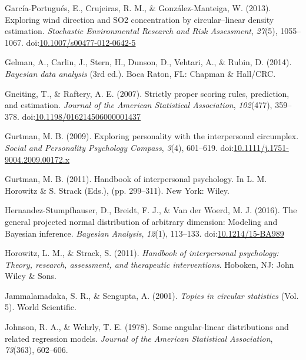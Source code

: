 \documentclass[man,mask]{apa6}
\DeclareRobustCommand{\VANDER}[3]{#2}
\begin{document}
\leavevmode\hypertarget{ref-garcia2013exploring}{}%
García-Portugués, E., Crujeiras, R. M., \& González-Manteiga, W. (2013). Exploring wind direction and SO2 concentration by circular--linear density estimation. \emph{Stochastic Environmental Research and Risk Assessment}, \emph{27}(5), 1055--1067. doi:\href{https://doi.org/10.1007/s00477-012-0642-5}{10.1007/s00477-012-0642-5}

\leavevmode\hypertarget{ref-BDA}{}%
Gelman, A., Carlin, J., Stern, H., Dunson, D., Vehtari, A., \& Rubin, D. (2014). \emph{Bayesian data analysis} (3rd ed.). Boca Raton, FL: Chapman \& Hall/CRC.

\leavevmode\hypertarget{ref-gneiting2007strictly}{}%
Gneiting, T., \& Raftery, A. E. (2007). Strictly proper scoring rules, prediction, and estimation. \emph{Journal of the American Statistical Association}, \emph{102}(477), 359--378. doi:\href{https://doi.org/10.1198/016214506000001437}{10.1198/016214506000001437}

\leavevmode\hypertarget{ref-gurtman2009exploring}{}%
Gurtman, M. B. (2009). Exploring personality with the interpersonal circumplex. \emph{Social and Personality Psychology Compass}, \emph{3}(4), 601--619. doi:\href{https://doi.org/10.1111/j.1751-9004.2009.00172.x}{10.1111/j.1751-9004.2009.00172.x}

\leavevmode\hypertarget{ref-gurtman2011reasoning}{}%
Gurtman, M. B. (2011). Handbook of interpersonal psychology. In L. M. Horowitz \& S. Strack (Eds.), (pp. 299--311). New York: Wiley.

\leavevmode\hypertarget{ref-hernandez2016general}{}%
Hernandez-Stumpfhauser, D., Breidt, F. J., \& \VANDER{Woerd}{Van der}{van der} Woerd, M. J. (2016). The general projected normal distribution of arbitrary dimension: Modeling and Bayesian inference. \emph{Bayesian Analysis}, \emph{12}(1), 113--133. doi:\href{https://doi.org/10.1214/15-BA989}{10.1214/15-BA989}

\leavevmode\hypertarget{ref-horowitz2010handbook}{}%
Horowitz, L. M., \& Strack, S. (2011). \emph{Handbook of interpersonal psychology: Theory, research, assessment, and therapeutic interventions}. Hoboken, NJ: John Wiley \& Sons.

\leavevmode\hypertarget{ref-jammalamadaka2001topics}{}%
Jammalamadaka, S. R., \& Sengupta, A. (2001). \emph{Topics in circular statistics} (Vol. 5). World Scientific.

\leavevmode\hypertarget{ref-johnson1978some}{}%
Johnson, R. A., \& Wehrly, T. E. (1978). Some angular-linear distributions and related regression models. \emph{Journal of the American Statistical Association}, \emph{73}(363), 602--606.
\end{document}
